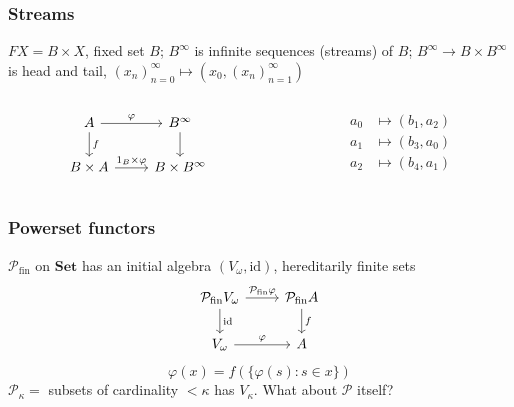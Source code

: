 \documentclass{beamer}
\begin{document}
\begin{frame}
  \frametitle{Streams}
  $FX = B \times X$, fixed set $B$; $B^\infty$ is infinite sequences (streams) of $B$;
  $B^\infty \to B \times B^\infty$ is head and tail, $(x_n)_{n=0}^\infty \mapsto \left( x_0, (x_n)_{n=1}^\infty\right)$
  \pause
  \begin{columns}
    \begin{column}{0.5\textwidth}
      \begin{equation*}
        \begin{tikzcd}[ampersand replacement=\&]
          A \rar{\varphi} \dar{f} \& B^\infty \dar \\
          B \times A \rar{1_B \times \varphi} \& B \times B^\infty
      \end{tikzcd}
    \end{equation*}
    \end{column}
    \begin{column}{0.5\textwidth}
      \begin{align*}
        a_0 &\mapsto (b_1, a_2) \\
        a_1 &\mapsto (b_3, a_0) \\
        a_2 &\mapsto (b_4, a_1)
      \end{align*}
      \vspace{-2em}
    \end{column}
  \end{columns}

\end{frame}
\begin{frame}[fragile]
  \frametitle{Powerset functors}
  $\mathcal{P}_\text{fin}$ on $\mathbf{Set}$ has an initial algebra $(V_\omega, \text{id})$, \alert{hereditarily finite sets}
  \begin{equation*}
    \begin{tikzcd}
      \mathcal{P}_{\text{fin}} V_\omega \dar{\text{id}} \rar{\mathcal{P}_{\text{fin}} \varphi} & \mathcal{P}_{\text{fin}} A \dar{f} \\
      V_\omega \rar{\varphi} & A
    \end{tikzcd}
  \end{equation*}
  \pause
  \begin{equation*}
    \varphi(x) = f(\{\varphi(s) : s \in x\})
  \end{equation*}
  \pause
  $\mathcal{P}_\kappa =$ subsets of cardinality $<\kappa$ has $V_\kappa$.
  What about $\mathcal{P}$ itself?
\end{frame}
\end{document}
